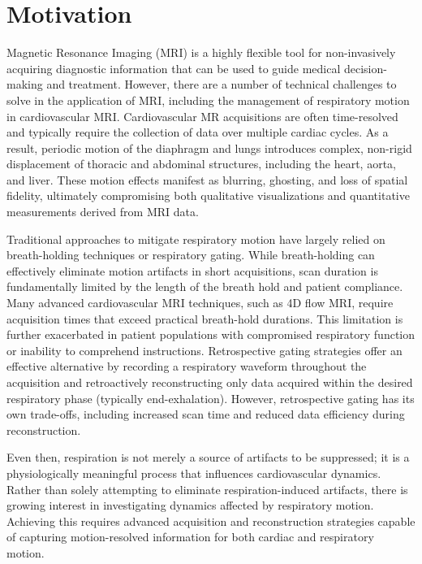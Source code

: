 \section{Motivation}\label{sec:motivation}

Magnetic Resonance Imaging (MRI) is a highly flexible tool for non-invasively acquiring diagnostic information that can be used to guide medical decision-making and treatment. However, there are a number of technical challenges to solve in the application of MRI, including the management of respiratory motion in cardiovascular MRI\@. Cardiovascular MR acquisitions are often time-resolved and typically require the collection of data over multiple cardiac cycles. As a result, periodic motion of the diaphragm and lungs introduces complex, non-rigid displacement of thoracic and abdominal structures, including the heart, aorta, and liver. These motion effects manifest as blurring, ghosting, and loss of spatial fidelity, ultimately compromising both qualitative visualizations and quantitative measurements derived from MRI data.

Traditional approaches to mitigate respiratory motion have largely relied on breath-holding techniques or respiratory gating. While breath-holding can effectively eliminate motion artifacts in short acquisitions, scan duration is fundamentally limited by the length of the breath hold and patient compliance. Many advanced cardiovascular MRI techniques, such as 4D flow MRI, require acquisition times that exceed practical breath-hold durations. This limitation is further exacerbated in patient populations with compromised respiratory function or inability to comprehend instructions. Retrospective gating strategies offer an effective alternative by recording a respiratory waveform throughout the acquisition and retroactively reconstructing only data acquired within the desired respiratory phase (typically end-exhalation). However, retrospective gating has its own trade-offs, including increased scan time and reduced data efficiency during reconstruction.

Even then, respiration is not merely a source of artifacts to be suppressed; it is a physiologically meaningful process that influences cardiovascular dynamics. Rather than solely attempting to eliminate respiration-induced artifacts, there is growing interest in investigating dynamics affected by respiratory motion. Achieving this requires advanced acquisition and reconstruction strategies capable of capturing motion-resolved information for both cardiac and respiratory motion.

